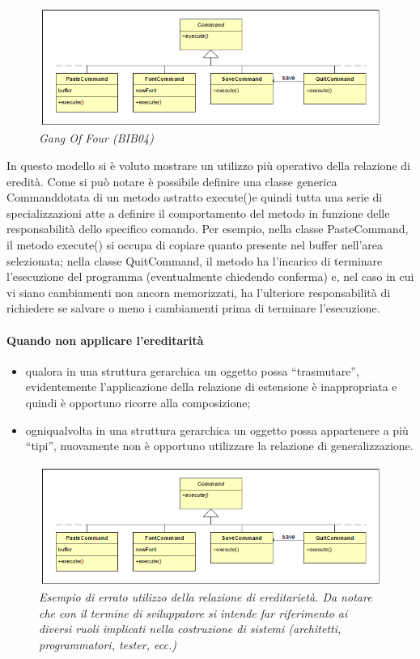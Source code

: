 \begin{figure}[H]
\includegraphics[scale=0.8]{images/commandEreditarita}
\caption{\textit{Gang Of Four (BIB04)} \label{fig:ered1}}
\end{figure}
In questo modello si è voluto mostrare un utilizzo più operativo della relazione di eredità. Come si può notare è possibile definire una classe generica Commanddotata di un metodo astratto execute()e quindi tutta una serie di specializzazioni atte a definire il comportamento del metodo in funzione delle responsabilità dello specifico comando. Per esempio, nella classe PasteCommand, il metodo execute() si occupa di copiare quanto presente nel buffer nell’area selezionata; nella classe QuitCommand, il metodo ha l’incarico di terminare l’esecuzione del programma (eventualmente chiedendo conferma) e, nel caso in cui vi siano cambiamenti non ancora memorizzati, ha l’ulteriore responsabilità di richiedere se salvare o meno i cambiamenti prima di terminare l’esecuzione.


\paragraph{Quando non applicare l'ereditarità}
\begin{itemize}
\item qualora in una struttura gerarchica un oggetto possa “trasmutare”, evidentemente l’applicazione della relazione di estensione è inappropriata e quindi è opportuno ricorre alla composizione;
\item ogniqualvolta in una struttura gerarchica un oggetto possa appartenere a più “tipi”, nuovamente non è opportuno utilizzare la relazione di generalizzazione.
\end{itemize}

\begin{figure}[H]
\includegraphics[scale=0.8]{images/commandEreditarita}
\caption{\textit{Esempio di errato utilizzo della relazione di ereditarietà. Da notare che con il termine di sviluppatore si intende far riferimento ai diversi ruoli implicati nella costruzione di sistemi (architetti, programmatori, tester, ecc.)} \label{fig:ered2}}
\end{figure}

